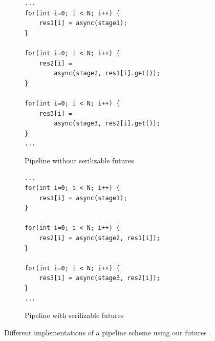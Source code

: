 \begin{figure}
\begin{subfigure}[b]{.6\textwidth}
\begin{minipage}{.48\textwidth}
\begin{lstlisting}
...
for(int i=0; i < N; i++) {
	res1[i] = async(stage1);
}

for(int i=0; i < N; i++) {
	res2[i] = 
		async(stage2, res1[i].get());
} 

for(int i=0; i < N; i++) {
	res3[i] = 
		async(stage3, res2[i].get());
} 
...
\end{lstlisting}
\caption{Pipeline without serilizable futures}
\end{minipage}
\end{subfigure}
\hfill
\begin{subfigure}[b]{.6\textwidth}
\begin{minipage}{.48\textwidth}

\begin{lstlisting}
...
for(int i=0; i < N; i++) {
	res1[i] = async(stage1);
}

for(int i=0; i < N; i++) {
	res2[i] = async(stage2, res1[i]);
} 

for(int i=0; i < N; i++) {
	res3[i] = async(stage3, res2[i]);
} 
...
\end{lstlisting}
\caption{Pipeline with serilizable futures}
\end{minipage}
\end{subfigure}
\caption{	Different implementations of a pipeline scheme using our futures .}
\end{figure}

